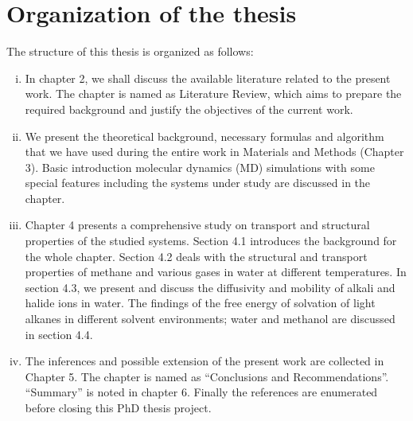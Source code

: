 \section{Organization of the thesis}
The structure of this thesis is organized as follows: 
\begin{enumerate}[(i)]
\item In chapter 2,  we shall discuss the available literature related to the present work. The chapter is named as Literature Review, which aims to prepare the required background and justify the objectives of the current work.

\item We present the theoretical background, necessary formulas and algorithm that we have used during the entire work in Materials and Methods (Chapter 3). Basic introduction  molecular dynamics (MD) simulations with some special features including the systems under study are discussed in the chapter. 

\item Chapter 4 presents a comprehensive study on transport and structural properties  of the studied systems. Section 4.1 introduces the background for the whole chapter. Section 4.2 deals with the structural and transport properties of methane and various gases in water at different temperatures.  In section 4.3, we present and discuss the diffusivity and mobility of alkali and halide ions in water. The findings of the free energy of solvation of light alkanes in different solvent environments; water and methanol are discussed in section 4.4.

\item The inferences and possible extension of the present work are collected in Chapter 5. The chapter is named as ``Conclusions and Recommendations''. ``Summary'' is noted in chapter 6. Finally the references are enumerated  before closing this PhD thesis project. 
\end{enumerate} 


